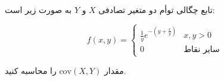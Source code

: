 \problem{}
تابع چگالی توأم دو متغیر تصادفی \( X \) و \( Y \) به صورت زیر است: 

 \[ f(x, y) = \begin{cases} \frac{1}{y} e^{-(y + \frac{x}{y})} & x, y > 0 \\ 0 & \text{سایر نقاط} \end{cases} \] 

 مقدار \( \text{cov}(X, Y) \) را محاسبه کنید.